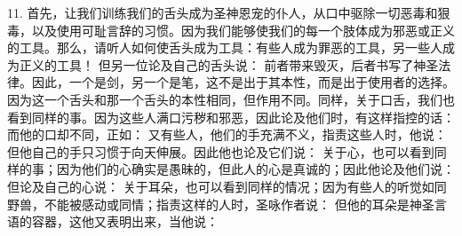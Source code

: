 11. 首先，让我们训练我们的舌头成为圣神恩宠的仆人，从口中驱除一切恶毒和狠毒，以及使用可耻言辞的习惯。因为我们能够使我们的每一个肢体成为邪恶或正义的工具。那么，请听人如何使舌头成为工具：有些人成为罪恶的工具，另一些人成为正义的工具！ 但另一位论及自己的舌头说： 前者带来毁灭，后者书写了神圣法律。因此，一个是剑，另一个是笔，这不是出于其本性，而是出于使用者的选择。因为这一个舌头和那一个舌头的本性相同，但作用不同。同样，关于口舌，我们也看到同样的事。因为这些人满口污秽和邪恶，因此论及他们时，有这样指控的话： 而他的口却不同，正如： 又有些人，他们的手充满不义，指责这些人时，他说： 但他自己的手只习惯于向天伸展。因此他也论及它们说： 关于心，也可以看到同样的事；因为他们的心确实是愚昧的，但此人的心是真诚的；因此他论及他们说： 但论及自己的心说： 关于耳朵，也可以看到同样的情况；因为有些人的听觉如同野兽，不能被感动或同情；指责这样的人时，圣咏作者说： 但他的耳朵是神圣言语的容器，这他又表明出来，当他说：\par

